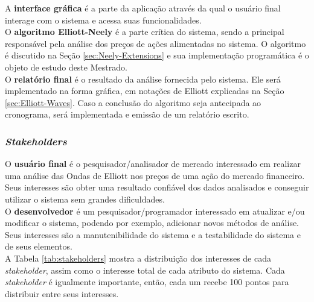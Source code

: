 \documentclass[12pt]{article}
\begin{document}
A \textbf{interface gráfica} é a parte da aplicação através da qual o usuário final interage
com o sistema e acessa suas funcionalidades.\\

O \textbf{algoritmo Elliott-Neely} é a parte crítica do sistema, sendo a principal responsável
pela análise dos preços de ações alimentadas no sistema. O algoritmo é discutido na Seção
\ref{sec:Neely-Extensions} e sua implementação programática é o objeto de estudo deste
Mestrado.\\

O \textbf{relatório final} é o resultado da análise fornecida pelo sistema. Ele será
implementado na forma gráfica, em notações de Elliott explicadas na Seção
\ref{sec:Elliott-Waves}. Caso a conclusão do algoritmo seja antecipada ao cronograma,
será implementada e emissão de um relatório escrito.

\subsubsection{\textit{Stakeholders}}

O \textbf{usuário final} é o pesquisador/analisador de mercado interessado em realizar uma
análise das Ondas de Elliott nos preços de uma ação do mercado financeiro. Seus interesses são
obter uma resultado confiável dos dados analisados e conseguir utilizar o sistema sem grandes
dificuldades.\\

O \textbf{desenvolvedor} é um pesquisador/programador interessado em atualizar e/ou modificar
o sistema, podendo por exemplo, adicionar novos métodos de análise. Seus interesses são a
manutenibilidade do sistema e a testabilidade do sistema e de seus elementos.\\

A Tabela \ref{tab:stakeholders} mostra a distribuição dos interesses de cada 
\textit{stakeholder}, assim como o interesse total de cada atributo do sistema. Cada
\textit{stakeholder} é igualmente importante, então, cada um recebe 100 pontos para distribuir
entre seus interesses.
\end{document}
